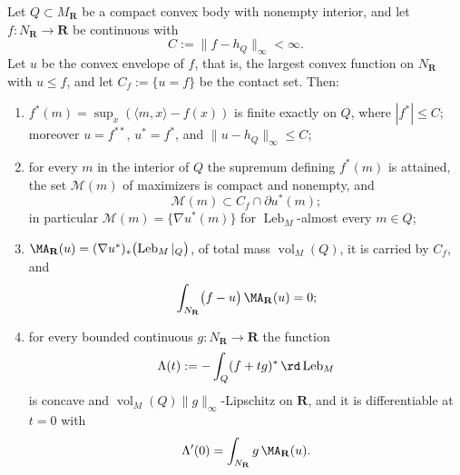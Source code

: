 \begin{theorem}
\label{thm:ch27-legendre-orthogonality}
Let \(Q\subset M_{\mathbf R}\) be a compact convex body with nonempty
interior, and let \(f:N_{\mathbf R}\to\mathbf R\) be continuous with
\[
 C:=\lVert f-h_Q\rVert_\infty<\infty .
\]
Let \(u\) be the convex envelope of \(f\), that is, the largest convex
function on \(N_{\mathbf R}\) with \(u\leq f\), and let
\(C_f:=\{u=f\}\) be the contact set.  Then:
\begin{enumerate}
\item \(f^*(m)=\sup_{x}(\langle m,x\rangle-f(x))\) is finite exactly on
\(Q\), where \(|f^*|\leq C\); moreover \(u=f^{**}\), \(u^*=f^*\), and
\(\lVert u-h_Q\rVert_\infty\leq C\);
\item for every \(m\) in the interior of \(Q\) the supremum defining
\(f^*(m)\) is attained, the set \(\mathcal M(m)\) of maximizers is compact
and nonempty, and
\[
 \mathcal M(m)\subset C_f\cap\partial u^*(m);
\]
in particular \(\mathcal M(m)=\{\nabla u^*(m)\}\) for
\(\operatorname{Leb}_M\)-almost every \(m\in Q\);
\item \(\MA_{\mathbf R}(u)=(\nabla u^*)_*\bigl(
\operatorname{Leb}_M|_Q\bigr)\), of total mass
\(\operatorname{vol}_M(Q)\), it is carried by \(C_f\), and
\begin{equation}\label{eq:ch27-convex-orthogonality}
 \int_{N_{\mathbf R}}\bigl(f-u\bigr)\,\MA_{\mathbf R}(u)=0;
\end{equation}
\item for every bounded continuous \(g:N_{\mathbf R}\to\mathbf R\) the
function
\[
 \Lambda(t):=-\int_Q(f+tg)^*\,\rd\operatorname{Leb}_M
\]
is concave and \(\operatorname{vol}_M(Q)\lVert g\rVert_\infty\)-Lipschitz on
\(\mathbf R\), and it is differentiable at \(t=0\) with
\begin{equation}\label{eq:ch27-convex-derivative}
 \Lambda'(0)=\int_{N_{\mathbf R}}g\,\MA_{\mathbf R}(u).
\end{equation}
\end{enumerate}
\end{theorem}

